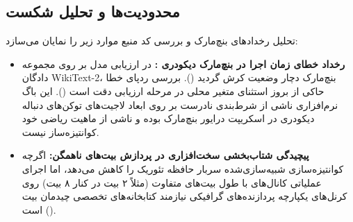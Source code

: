 \subsection{محدودیت‌ها و تحلیل شکست}
تحلیل رخدادهای بنچ‌مارک و بررسی کد منبع موارد زیر را نمایان می‌سازد:
\begin{itemize}
    \item \textbf{رخداد خطای زمان اجرا در بنچ‌مارک دیکودری :} در ارزیابی مدل  بر روی مجموعه دادگان WikiText-2، بنچ‌مارک دچار وضعیت کرش گردید (). بررسی ردپای خطا حاکی از بروز استثنای متغیر محلی در مرحله ارزیابی دقت است (). این باگ نرم‌افزاری ناشی از شرط‌بندی نادرست بر روی ابعاد لاجیت‌های توکن‌های دنباله دیکودری در اسکریپت درایور بنچ‌مارک بوده و ناشی از ماهیت ریاضی خود کوانتیزه‌ساز نیست.
    \item \textbf{پیچیدگی شتاب‌بخشی سخت‌افزاری در پردازش بیت‌های ناهمگن:} اگرچه کوانتیزه‌سازی شبیه‌سازی‌شده سربار حافظه تئوریک را کاهش می‌دهد، اما اجرای عملیاتی کانال‌های با طول بیت‌های متفاوت (مثلاً ۲ بیت در کنار ۸ بیت) روی کرنل‌های  یکپارچه پردازنده‌های گرافیکی نیازمند کتابخانه‌های تخصصی چیدمان بیت () است.
\end{itemize}
